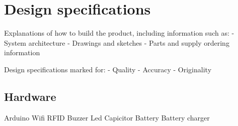 \section{Design specifications}
Explanations of how to build the product, including information such as:
- System architecture
- Drawings and sketches
- Parts and supply ordering information

Design specifications marked for:
- Quality
- Accuracy
- Originality

\subsection{Hardware}
Arduino
Wifi
RFID
Buzzer
Led
Capicitor
Battery
Battery charger

